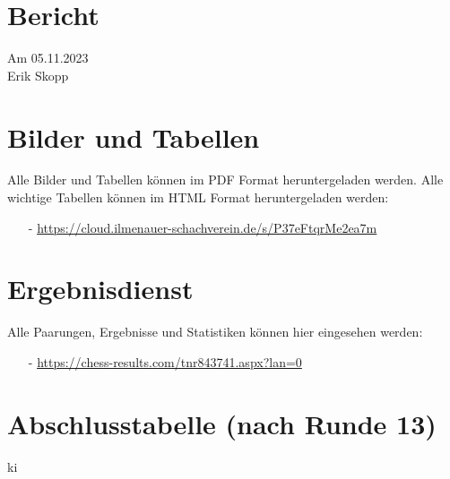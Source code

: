 \documentclass[a4paper,ngerman]{tui-algo-seminar}
\title{\inhalt}
\author{Erik Skopp}
\newcommand{\inhalt}{1. Ilmenauer Nikolaus Blitz 2023}
\begin{document}
	
	\maketitle
	\thispagestyle{plain} %
	\begin{abstract}
		Bericht: \inhalt.\\
		Das erste Nikolaus Blitzturnier des Ilmenauer Schachverein fand am 08.12.2023 
	\end{abstract}
	
	\section{Bericht}
	Am 05.11.2023 \\
	
	
	Erik Skopp
	
	
	\section{Bilder und Tabellen}
	Alle Bilder und Tabellen können im PDF Format heruntergeladen werden. Alle wichtige Tabellen können im HTML Format heruntergeladen werden: \\
	\begin{itemize}
		\item[-] \url{https://cloud.ilmenauer-schachverein.de/s/P37eFtqrMe2ea7m}
	\end{itemize}
	
	\section{Ergebnisdienst}
	Alle Paarungen, Ergebnisse und Statistiken können hier eingesehen werden: 
	\begin{itemize}
		\item[-]
		\url{https://chess-results.com/tnr843741.aspx?lan=0}
	\end{itemize}
	
\section{Abschlusstabelle (nach Runde 13)}
ki
	
	
\end{document}
